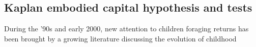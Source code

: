 

\subsection{Kaplan embodied capital hypothesis and tests}
During the '90s and early 2000, new attention to children foraging returns has been brought by a growing literature discussing the evolution of childhood \cite{bogin_evolutionary_1997}%

